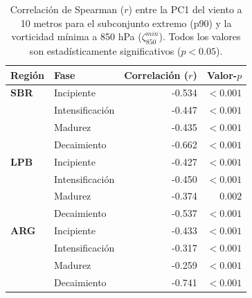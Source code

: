 \begin{table}[htbp]
\centering
\caption[Correlación entre PC1 y vorticidad - Subconjunto p90]{Correlación de Spearman ($r$) entre la PC1 del viento a 10 metros para el subconjunto extremo (p90) y la vorticidad mínima a 850 hPa ($\zeta_{850}^{min}$). Todos los valores son estadísticamente significativos ($p < 0.05$).}
\label{tab:corr_p90_w10}
\begin{tabular*}{\textwidth}{@{\extracolsep{\fill}}llrr}
\hline
\textbf{Región} & \textbf{Fase} & \textbf{Correlación ($r$)} & \textbf{Valor-$p$} \\
\hline
\textbf{SBR} & Incipiente & -0.534 & $<0.001$ \\
 & Intensificación & -0.447 & $<0.001$ \\
 & Madurez & -0.435 & $<0.001$ \\
 & Decaimiento & -0.662 & $<0.001$ \\
\hline
\textbf{LPB} & Incipiente & -0.427 & $<0.001$ \\
 & Intensificación & -0.450 & $<0.001$ \\
 & Madurez & -0.374 & $0.002$ \\
 & Decaimiento & -0.537 & $<0.001$ \\
\hline
\textbf{ARG} & Incipiente & -0.433 & $<0.001$ \\
 & Intensificación & -0.317 & $<0.001$ \\
 & Madurez & -0.259 & $<0.001$ \\
 & Decaimiento & -0.741 & $<0.001$ \\
\hline
\end{tabular*}
\end{table}